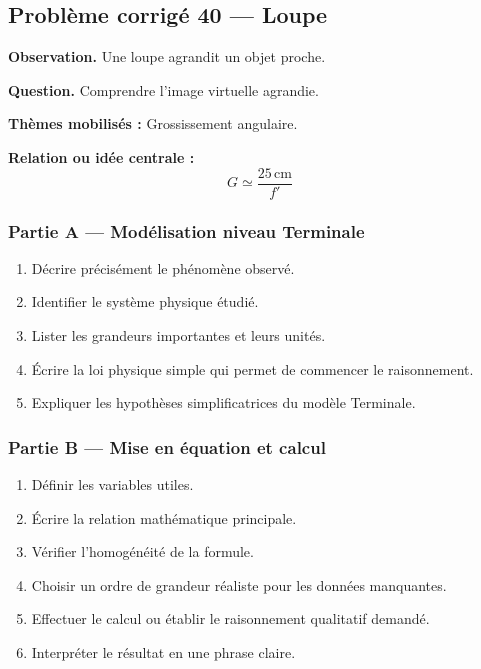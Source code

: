 \documentclass[11pt,a4paper]{article}
\begin{document}
\subsection{Problème corrigé 40 — Loupe}

\begin{exercicebox}
\textbf{Observation.} Une loupe agrandit un objet proche.

\medskip
\textbf{Question.} Comprendre l'image virtuelle agrandie.

\medskip
\textbf{Thèmes mobilisés :} Grossissement angulaire.

\medskip
\textbf{Relation ou idée centrale :}
\[
G\simeq\frac{25\,\mathrm{cm}}{f'}
\]
\end{exercicebox}

\subsubsection*{Partie A — Modélisation niveau Terminale}

\begin{enumerate}
  \item Décrire précisément le phénomène observé.
  \item Identifier le système physique étudié.
  \item Lister les grandeurs importantes et leurs unités.
  \item Écrire la loi physique simple qui permet de commencer le raisonnement.
  \item Expliquer les hypothèses simplificatrices du modèle Terminale.
\end{enumerate}

\subsubsection*{Partie B — Mise en équation et calcul}

\begin{enumerate}
  \item Définir les variables utiles.
  \item Écrire la relation mathématique principale.
  \item Vérifier l'homogénéité de la formule.
  \item Choisir un ordre de grandeur réaliste pour les données manquantes.
  \item Effectuer le calcul ou établir le raisonnement qualitatif demandé.
  \item Interpréter le résultat en une phrase claire.
\end{enumerate}
\end{document}
